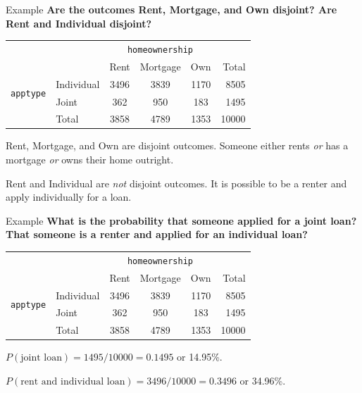 \begin{frame}{Example}
    \textbf{Are the outcomes Rent, Mortgage, and Own disjoint? Are Rent and Individual disjoint?}
    \begin{center}
        \begin{tabular}{r l ccc r}
		& & \multicolumn{3}{c}{{\texttt{homeownership}}} & \\
        \cline{3-5}
		& & Rent & Mortgage & Own & Total  \\ 
        \cline{2-6}
        \multirow{2}{*}{{\texttt{apptype}}} 
        & Individual & 3496 & 3839 & 1170 & 8505 \\ 
  		& Joint & 362 & 950 & 183 & 1495 \\ 
        \cline{2-6}
  		& Total	& 3858 & 4789 & 1353 & 10000 \\
        \cline{2-6}
    \end{tabular}
    \end{center}
    \vspace{12pt}Rent, Mortgage, and Own are disjoint outcomes. Someone either rents \textit{or} has a mortgage \textit{or} owns their home outright.
    
    \vspace{12pt}Rent and Individual are \textit{not} disjoint outcomes. It is possible to be a renter and apply individually for a loan.
\end{frame}

\begin{frame}{Example}
    \textbf{What is the probability that someone applied for a joint loan? That someone is a renter and applied for an individual loan?}
    \begin{center}
        \begin{tabular}{r l ccc r}
		& & \multicolumn{3}{c}{{\texttt{homeownership}}} & \\
        \cline{3-5}
		& & Rent & Mortgage & Own & Total  \\ 
        \cline{2-6}
        \multirow{2}{*}{{\texttt{apptype}}} 
        & Individual & 3496 & 3839 & 1170 & 8505 \\ 
  		& Joint & 362 & 950 & 183 & 1495 \\ 
        \cline{2-6}
  		& Total	& 3858 & 4789 & 1353 & 10000 \\
        \cline{2-6}
    \end{tabular}
    \end{center}
    \vspace{12pt}$P(\text{joint loan}) = 1495/10000 = 0.1495$ or 14.95\%.
    
    \vspace{12pt}$P(\text{rent and individual loan})=3496/10000=0.3496$ or 34.96\%.
\end{frame}

